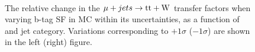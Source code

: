 \begin{figure}[!h]
  \centering
   ~~
  \\

  \caption{\label{fig:tfSyst_bsf_muToTtw} The relative change in the $\mu + jets \rightarrow \mathrm{tt+W}$ transfer
  factors when varying b-tag SF in MC within its uncertainties, as a function of \scalht and jet category. 
  Variations corresponding to $+1\sigma$ ($-1\sigma$) are shown in the left (right) figure. 
  }
\end{figure}





